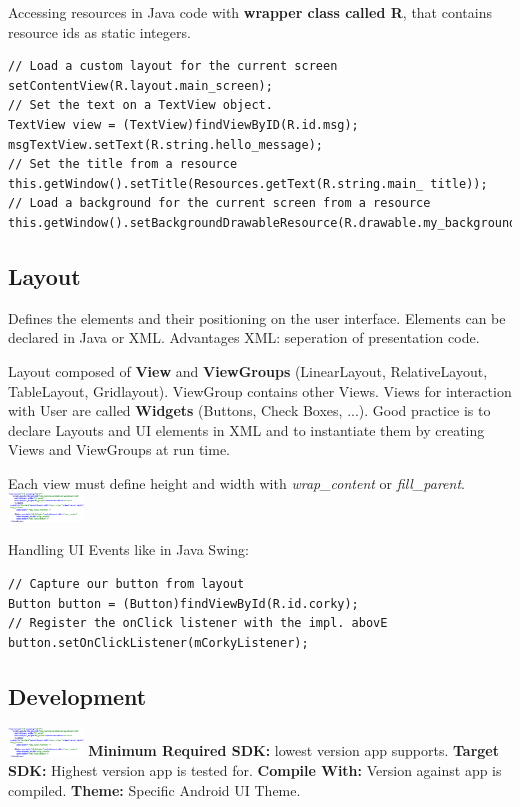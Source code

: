 Accessing resources in Java code with \textbf{wrapper class called R}, that
contains resource ids as static integers.

\begin{lstlisting}
// Load a custom layout for the current screen
setContentView(R.layout.main_screen);
// Set the text on a TextView object.
TextView view = (TextView)findViewByID(R.id.msg);
msgTextView.setText(R.string.hello_message);
// Set the title from a resource
this.getWindow().setTitle(Resources.getText(R.string.main_ title));
// Load a background for the current screen from a resource
this.getWindow().setBackgroundDrawableResource(R.drawable.my_background_image);
\end{lstlisting}

\subsection{Layout}
Defines the elements and their positioning on the user interface. Elements can
be declared in Java or XML. Advantages XML: seperation of presentation code.

Layout composed of \textbf{View} and \textbf{ViewGroups} (LinearLayout,
RelativeLayout, TableLayout, Gridlayout). ViewGroup contains other Views. Views
for interaction with User are called \textbf{Widgets} (Buttons, Check Boxes,
...). Good practice is to declare Layouts and UI elements in XML and to
instantiate them by creating Views and ViewGroups at run time.

Each view must define height and width with \textit{wrap\_content} or
\textit{fill\_parent}.
\includegraphics[width=0.15\textwidth]{android/view_example.png}

Handling UI Events like in Java Swing:
\begin{lstlisting}
// Capture our button from layout
Button button = (Button)findViewById(R.id.corky);
// Register the onClick listener with the impl. abovE
button.setOnClickListener(mCorkyListener);
\end{lstlisting}

\subsection{Development}
\includegraphics[width=0.15\textwidth]{android/view_example.png}
\textbf{Minimum Required SDK:} lowest version app supports.
\textbf{Target SDK:} Highest version app is tested for.
\textbf{Compile With:} Version against app is compiled.
\textbf{Theme:} Specific Android UI Theme.


